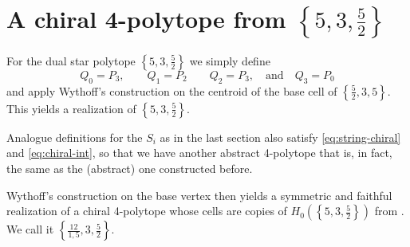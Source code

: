 \documentclass{article}
\theoremstyle{definition}
\begin{document}
	
	\section{A chiral 4-polytope from $\left\{5,3,\frac{5}{2}\right\}$}
	For the dual star polytope $\left\{5,3,\frac{5}{2}\right\}$ we simply define
	\[Q_0=P_3,\qquad Q_1=P_2\qquad Q_2=P_3,\quad\text{and}\quad Q_3=P_0\]
	and apply Wythoff's construction on the centroid of the base cell of $\left\{\frac{5}{2},3,5\right\}$. This yields a realization of $\left\{5,3,\frac{5}{2}\right\}$.
	
	Analogue definitions for the $S_i$ as in the last section also satisfy \cref{eq:string-chiral} and \cref{eq:chiral-int}, so that we have another abstract 4-polytope that is, in fact, the same as the (abstract) one constructed before.
	
	Wythoff's construction on the base vertex then yields a symmetric and faithful realization of a chiral 4-polytope whose cells are copies of $H_0(\left\{5,3,\frac{5}{2}\right\})$ from \cite{petcox}. We call it $\left\{\frac{12}{1,5},3,\frac{5}{2}\right\}$.
	
\end{document}
